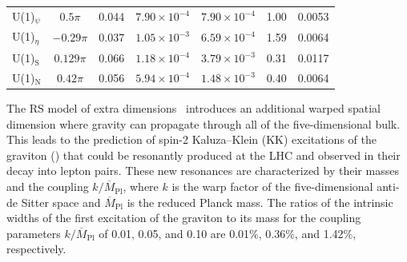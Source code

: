 \documentclass[11pt,twoside,a4paper,cmspaper,final,collab]{cms-tdr}
\begin{document}
\begin{table}[htb!]
\begin{tabular}{lcccccc}
U(1)$_{\psi}$       &     $0.5\pi$  &     0.044	         & $7.90\times10^{-4}$ & $7.90\times10^{-4}$ &  1.00                & 0.0053 			\\
U(1)$_{\eta}$       &   $-0.29\pi$  &     0.037            & $1.05\times10^{-3}$ & $6.59\times10^{-4}$ &  1.59                & 0.0064 		\\
U(1)$_\text{S}$     &   $0.129\pi$  &     0.066            & $1.18\times10^{-4}$ & $3.79\times10^{-3}$ &  0.31                & 0.0117 			\\
U(1)$_\text{N}$     &    $0.42\pi$  &     0.056            & $5.94\times10^{-4}$ & $1.48\times10^{-3}$ &  0.40                & 0.0064 		\\
\hline
\end{tabular}
\end{table}

The RS model of extra dimensions~\cite{Randall:1999vf, Randall:1999ee}  introduces an additional warped spatial dimension where gravity can propagate through all of the five-dimensional bulk. This leads to the prediction of spin-2 Kaluza--Klein (KK) excitations of the graviton (\GKK) that could be resonantly produced at the LHC and observed in their decay into lepton pairs. These new resonances are characterized by their masses and the coupling $k/\overline{M}_\mathrm{Pl}$, where $k$ is the warp factor of the five-dimensional anti-de Sitter space and $\overline{M}_\mathrm{Pl}$ is the reduced Planck mass. The ratios of the intrinsic widths of the first excitation of the graviton to its mass for the coupling parameters $k/\overline{M}_\mathrm{Pl}$ of 0.01, 0.05, and 0.10 are 0.01\%, 0.36\%, and 1.42\%, respectively.
\end{document}
